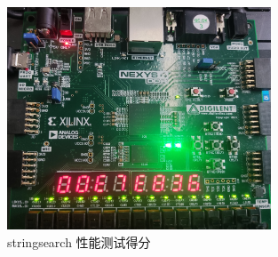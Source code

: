\begin{figure}[htbp]
    \centering
    \includegraphics[width=0.7\textwidth]{image/per10.jpg}
    \caption{stringsearch 性能测试得分}
    \label{fig:per10}
\end{figure}
\newpage{}
